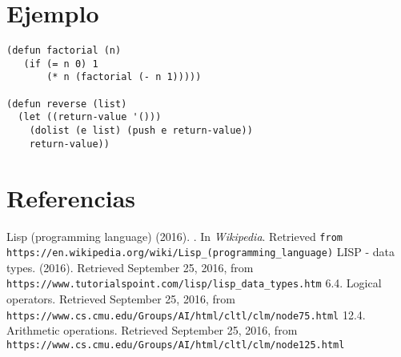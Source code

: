 \documentclass{IEEEtran}
\begin{document}
\section{Ejemplo}
\begin{lstlisting}
(defun factorial (n)
   (if (= n 0) 1
       (* n (factorial (- n 1)))))

(defun reverse (list)
  (let ((return-value '()))
    (dolist (e list) (push e return-value))
    return-value))
\end{lstlisting}

\section{Referencias}

\begin{thebibliography}{99}

 Lisp (programming language) (2016). . In \emph{Wikipedia}. Retrieved \texttt{from https://en.wikipedia.org/wiki/Lisp\_(programming\_language)}
 LISP - data types. (2016). Retrieved September 25, 2016, from \texttt{https://www.tutorialspoint.com/lisp/lisp\_data\_types.htm}
 6.4. Logical operators. Retrieved September 25, 2016, from \texttt{https://www.cs.cmu.edu/Groups/AI/html/cltl/clm/node75.html}
 12.4. Arithmetic operations. Retrieved September 25, 2016, from \texttt{https://www.cs.cmu.edu/Groups/AI/html/cltl/clm/node125.html}

\end{thebibliography}
\end{document}
